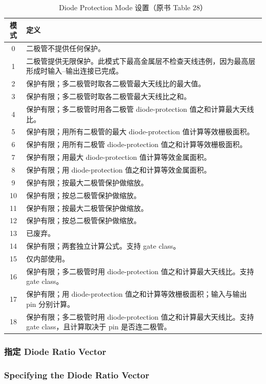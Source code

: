 \begin{table}[htbp]
\centering
\caption{Diode Protection Mode 设置（原书 Table 28）}
\label{tab:diode-protection-mode}
\begin{tabular}{@{}cp{}@{}}
\toprule
模式 & 定义 \\
\midrule
0 & 二极管不提供任何保护。 \\
1 & 二极管提供无限保护。此模式下最高金属层不检查天线违例，因为最高层形成时输入--输出连接已完成。 \\
2 & 保护有限；多二极管时取各二极管最大天线比的最大值。 \\
3 & 保护有限；多二极管时取各二极管最大天线比之和。 \\
4 & 保护有限；多二极管时用各二极管 diode-protection 值之和计算最大天线比。 \\
5 & 保护有限；用所有二极管的最大 diode-protection 值计算等效栅极面积。 \\
6 & 保护有限；用所有二极管 diode-protection 值之和计算等效栅极面积。 \\
7 & 保护有限；用最大 diode-protection 值计算等效金属面积。 \\
8 & 保护有限；用 diode-protection 值之和计算等效金属面积。 \\
9 & 保护有限；按最大二极管保护做缩放。 \\
10 & 保护有限；按总二极管保护做缩放。 \\
11 & 保护有限；按最大二极管保护做缩放。 \\
12 & 保护有限；按总二极管保护做缩放。 \\
13 & 已废弃。 \\
14 & 保护有限；两套独立计算公式。支持 gate class。 \\
15 & 仅内部使用。 \\
16 & 保护有限；多二极管时用 diode-protection 值之和计算最大天线比。支持 gate class。 \\
17 & 保护有限；用 diode-protection 值之和计算等效栅极面积；输入与输出 pin 分别计算。 \\
18 & 保护有限；多二极管时用 diode-protection 值之和计算最大天线比。支持 gate class，且计算取决于 pin 是否连二极管。 \\
\bottomrule
\end{tabular}
\end{table}

\subsubsection{指定 Diode Ratio Vector}
\subsubsection*{Specifying the Diode Ratio Vector}

